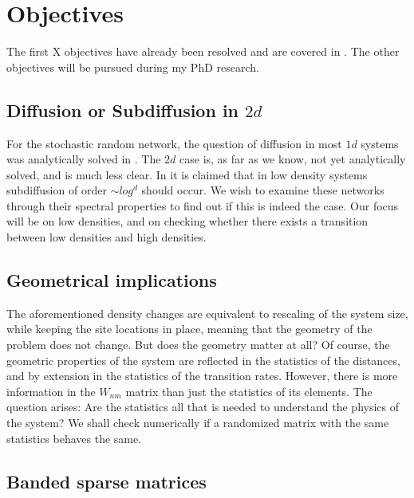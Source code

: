 \chapter{Objectives}


The first X objectives have already been resolved and are covered in 
\label{sec:papers}. The other objectives will be pursued during my PhD research.


\section{Diffusion or Subdiffusion in $2d$}

For the stochastic random network, the question of diffusion in most $1d$ systems was analytically solved in \cite{alexander_excitation_1981}. 
The $2d$ case is, as far as we know, not yet analytically solved, and is much less clear. 
In \cite{amir_localization_2010} it is claimed that in low density systems subdiffusion of
order $\sim log^d$ should occur. We wish to examine these networks through their spectral
properties to find out if this is indeed the case. Our focus will be on low densities,
and on checking whether there exists a transition between low densities and high densities.


\section{Geometrical implications}%

The aforementioned density changes are equivalent to rescaling of the system size,
while keeping the site locations in place, meaning that the geometry of the problem 
does not change. But does the geometry matter at all? Of course, the geometric properties
of the system are reflected in the statistics of the distances,
and by extension in the statistics of the transition rates. 
However, there is more information in the $W_{nm}$ matrix than just the statistics of its elements.
The question arises: Are the statistics all that is needed to understand the physics of the system? 
We shall check numerically if a randomized matrix with the same statistics behaves the same.



\section{Banded sparse matrices}


